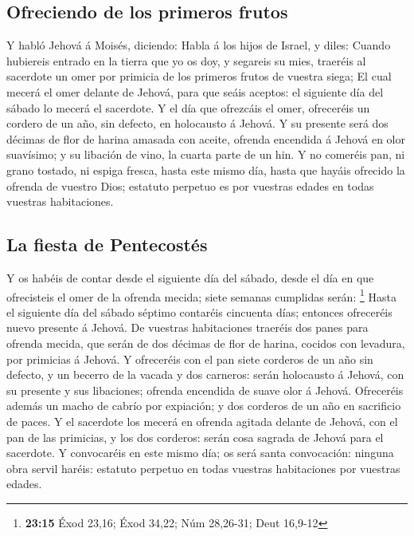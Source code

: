 \hypertarget{ofreciendo-de-los-primeros-frutos}{%
\subsection{Ofreciendo de los primeros
frutos}\label{ofreciendo-de-los-primeros-frutos}}

 Y habló Jehová á Moisés, diciendo:  Habla á
los hijos de Israel, y diles: Cuando hubiereis entrado en la tierra que
yo os doy, y segareis su mies, traeréis al sacerdote un omer por
primicia de los primeros frutos de vuestra siega;  El cual
mecerá el omer delante de Jehová, para que seáis aceptos: el siguiente
día del sábado lo mecerá el sacerdote.  Y el día que
ofrezcáis el omer, ofreceréis un cordero de un año, sin defecto, en
holocausto á Jehová.  Y su presente será dos décimas de
flor de harina amasada con aceite, ofrenda encendida á Jehová en olor
suavísimo; y su libación de vino, la cuarta parte de un hin.
 Y no comeréis pan, ni grano tostado, ni espiga fresca,
hasta este mismo día, hasta que hayáis ofrecido la ofrenda de vuestro
Dios; estatuto perpetuo es por vuestras edades en todas vuestras
habitaciones.

\hypertarget{la-fiesta-de-pentecostuxe9s}{%
\subsection{La fiesta de
Pentecostés}\label{la-fiesta-de-pentecostuxe9s}}

 Y os habéis de contar desde el siguiente día del sábado,
desde el día en que ofrecisteis el omer de la ofrenda mecida; siete
semanas cumplidas serán: \footnote{\textbf{23:15} Éxod 23,16; Éxod
  34,22; Núm 28,26-31; Deut 16,9-12}  Hasta el siguiente
día del sábado séptimo contaréis cincuenta días; entonces ofreceréis
nuevo presente á Jehová.  De vuestras habitaciones traeréis
dos panes para ofrenda mecida, que serán de dos décimas de flor de
harina, cocidos con levadura, por primicias á Jehová.  Y
ofreceréis con el pan siete corderos de un año sin defecto, y un becerro
de la vacada y dos carneros: serán holocausto á Jehová, con su presente
y sus libaciones; ofrenda encendida de suave olor á Jehová.
 Ofreceréis además un macho de cabrío por expiación; y dos
corderos de un año en sacrificio de paces.  Y el sacerdote
los mecerá en ofrenda agitada delante de Jehová, con el pan de las
primicias, y los dos corderos: serán cosa sagrada de Jehová para el
sacerdote.  Y convocaréis en este mismo día; os será santa
convocación: ninguna obra servil haréis: estatuto perpetuo en todas
vuestras habitaciones por vuestras edades.

